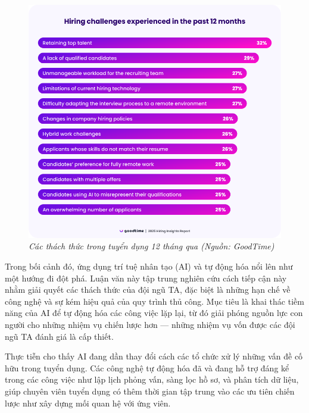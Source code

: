 \documentclass{article}
\begin{document}
\begin{figure}[H]
\centering
\includegraphics[width=1\linewidth]{img/hiring-challenges.png}
\caption{\centering\itshape Các thách thức trong tuyển dụng 12 tháng qua (Nguồn: GoodTime)}
\label{fig:hiring-challenges}
\end{figure}

Trong bối cảnh đó, ứng dụng trí tuệ nhân tạo (AI) và tự động hóa nổi lên như một hướng đi đột phá. Luận văn này tập trung nghiên cứu cách tiếp cận này nhằm giải quyết các thách thức của đội ngũ TA, đặc biệt là những hạn chế về công nghệ và sự kém hiệu quả của quy trình thủ công. Mục tiêu là khai thác tiềm năng của AI để tự động hóa các công việc lặp lại, từ đó giải phóng nguồn lực con người cho những nhiệm vụ chiến lược hơn — những nhiệm vụ vốn được các đội ngũ TA đánh giá là cấp thiết.

Thực tiễn cho thấy AI đang dần thay đổi cách các tổ chức xử lý những vấn đề cố hữu trong tuyển dụng. Các công nghệ tự động hóa đã và đang hỗ trợ đáng kể trong các công việc như lập lịch phỏng vấn, sàng lọc hồ sơ, và phân tích dữ liệu, giúp chuyên viên tuyển dụng có thêm thời gian tập trung vào các ưu tiên chiến lược như xây dựng mối quan hệ với ứng viên.
\end{document}
